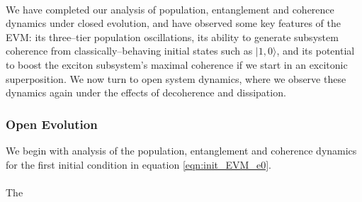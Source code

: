 \documentclass[11pt]{article}
\newcounter{subsubsubsection}[subsubsection]
\begin{document}
\\
We have completed our analysis of population, entanglement and coherence dynamics under closed evolution, and have observed some key features of the EVM: its three--tier population oscillations, its ability to generate subsystem coherence from classically--behaving initial states such as $|1,0\rangle$, and its potential to boost the exciton subsystem's maximal coherence if we start in an excitonic superposition. We now turn to open system dynamics, where we observe these dynamics again under the effects of decoherence and dissipation.
\subsubsection{Open Evolution}

We begin with analysis of the population, entanglement and coherence dynamics for the first initial condition in equation \ref{eqn:init_EVM_e0}.\\
\\
The 
\newpage
\end{document}
